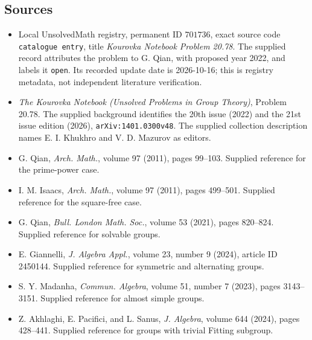\documentclass[11pt]{article}
\begin{document}
\subsection{Sources}
\begin{itemize}
\item Local UnsolvedMath registry, permanent ID \(701736\), exact source code \texttt{catalogue entry}, title \emph{Kourovka Notebook Problem 20.78}. The supplied record attributes the problem to G. Qian, with proposed year 2022, and labels it \texttt{open}. Its recorded update date is 2026-10-16; this is registry metadata, not independent literature verification.
\item \emph{The Kourovka Notebook (Unsolved Problems in Group Theory)}, Problem 20.78. The supplied background identifies the 20th issue (2022) and the 21st issue edition (2026), \texttt{arXiv:1401.0300v48}. The supplied collection description names E. I. Khukhro and V. D. Mazurov as editors.
\item G. Qian, \emph{Arch. Math.}, volume 97 (2011), pages 99--103. Supplied reference for the prime-power case.
\item I. M. Isaacs, \emph{Arch. Math.}, volume 97 (2011), pages 499--501. Supplied reference for the square-free case.
\item G. Qian, \emph{Bull. London Math. Soc.}, volume 53 (2021), pages 820--824. Supplied reference for solvable groups.
\item E. Giannelli, \emph{J. Algebra Appl.}, volume 23, number 9 (2024), article ID 2450144. Supplied reference for symmetric and alternating groups.
\item S. Y. Madanha, \emph{Commun. Algebra}, volume 51, number 7 (2023), pages 3143--3151. Supplied reference for almost simple groups.
\item Z. Akhlaghi, E. Pacifici, and L. Sanus, \emph{J. Algebra}, volume 644 (2024), pages 428--441. Supplied reference for groups with trivial Fitting subgroup.
\end{itemize}
\end{document}
